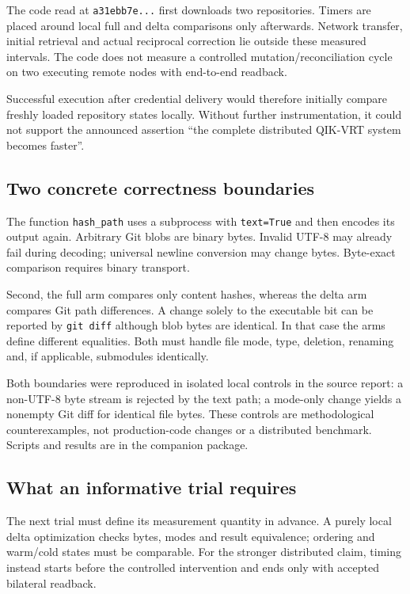 \begin{cols}
The code read at \texttt{a31ebb7e...} first downloads two repositories. Timers are placed around local full and delta comparisons only afterwards. Network transfer, initial retrieval and actual reciprocal correction lie outside these measured intervals. The code does not measure a controlled mutation/reconciliation cycle on two executing remote nodes with end-to-end readback. 

Successful execution after credential delivery would therefore initially compare freshly loaded repository states locally. Without further instrumentation, it could not support the announced assertion ``the complete distributed QIK-VRT system becomes faster''.

\subsection*{Two concrete correctness boundaries}
The function \texttt{hash\_path} uses a subprocess with \texttt{text=True} and then encodes its output again. Arbitrary Git blobs are binary bytes. Invalid UTF-8 may already fail during decoding; universal newline conversion may change bytes. Byte-exact comparison requires binary transport. 

Second, the full arm compares only content hashes, whereas the delta arm compares Git path differences. A change solely to the executable bit can be reported by \texttt{git diff} although blob bytes are identical. In that case the arms define different equalities. Both must handle file mode, type, deletion, renaming and, if applicable, submodules identically.

Both boundaries were reproduced in isolated local controls in the source report: a non-UTF-8 byte stream is rejected by the text path; a mode-only change yields a nonempty Git diff for identical file bytes. These controls are methodological counterexamples, not production-code changes or a distributed benchmark. Scripts and results are in the companion package. 

\subsection*{What an informative trial requires}
The next trial must define its measurement quantity in advance. A purely local delta optimization checks bytes, modes and result equivalence; ordering and warm/cold states must be comparable. For the stronger distributed claim, timing instead starts before the controlled intervention and ends only with accepted bilateral readback.


\end{cols}
